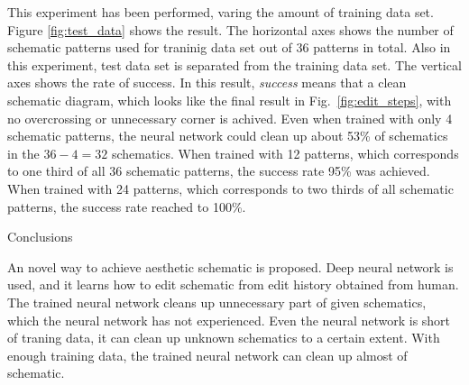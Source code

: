 \documentclass[twocolumn]{article}
\makeatletter
\def\section{\@startsection {section}{1}{\z@}{20pt plus 2pt minus 2pt}
{8pt plus 2pt minus 2pt}{\centering\normalsize\sc
\edef\@svsec{\thesection.\ }}}
\def\thesection{\Roman{section}}
\makeatother
\begin{document}
This experiment has been performed, varing the amount of training data set.
Figure \ref{fig:test_data} shows the result.
The horizontal axes shows the number of schematic patterns
used for traninig data set out of 36 patterns in total.
Also in this experiment, test data set is separated from the training data set.
The vertical axes shows the rate of success.
In this result, {\it success} means that a clean schematic diagram,
which looks like the final result in Fig.\ \ref{fig:edit_steps},
with no overcrossing or unnecessary corner is achived.
Even when trained with only 4 schematic patterns,
the neural network could clean up about 53\% of schematics
in the $36 - 4 = 32$ schematics.
When trained with 12 patterns,
which corresponds to one third of all 36 schematic patterns,
the success rate 95\% was achieved.
When trained with 24 patterns,
which corresponds to two thirds of all schematic patterns,
the success rate reached to 100\%.

\section{Conclusions}

An novel way to achieve aesthetic schematic is proposed.
Deep neural network is used, and it learns how to edit schematic
from edit history obtained from human.
The trained neural network cleans up unnecessary part of given schematics,
which the neural network has not experienced.
Even the neural network is short of traning data,
it can clean up unknown schematics to a certain extent.
With enough training data,
the trained neural network can clean up almost of schematic.

\end{document}
